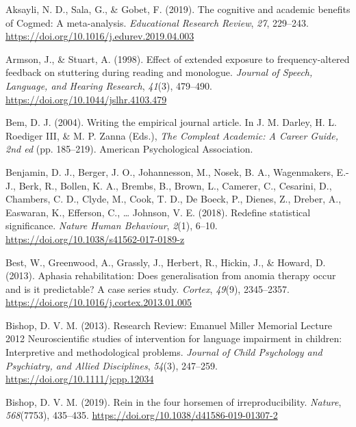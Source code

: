 \documentclass{krantz}
\newlength{\cslhangindent}
\newlength{\cslentryspacingunit} %
\newenvironment{CSLReferences}[2] %
{%
\setlength{\parindent}{0pt}
\ifodd #1
\let\oldpar\par
\def\par{\hangindent=\cslhangindent\oldpar}
\fi
\setlength{\parskip}{#2\cslentryspacingunit}
}%
{}
\begin{document}
\hypertarget{refs}{}
\begin{CSLReferences}{1}{0}
\leavevmode{}%
Aksayli, N. D., Sala, G., \& Gobet, F. (2019). The cognitive and academic benefits of {Cogmed}: {A} meta-analysis. \emph{Educational Research Review}, \emph{27}, 229--243. \url{https://doi.org/10.1016/j.edurev.2019.04.003}

\leavevmode{}%
Armson, J., \& Stuart, A. (1998). Effect of extended exposure to frequency-altered feedback on stuttering during reading and monologue. \emph{Journal of Speech, Language, and Hearing Research}, \emph{41}(3), 479--490. \url{https://doi.org/10.1044/jslhr.4103.479}

\leavevmode{}%
Bem, D. J. (2004). Writing the empirical journal article. In J. M. Darley, H. L. Roediger III, \& M. P. Zanna (Eds.), \emph{The {Compleat Academic}: {A Career Guide}, 2nd ed} (pp. 185--219). {American Psychological Association}.

\leavevmode{}%
Benjamin, D. J., Berger, J. O., Johannesson, M., Nosek, B. A., Wagenmakers, E.-J., Berk, R., Bollen, K. A., Brembs, B., Brown, L., Camerer, C., Cesarini, D., Chambers, C. D., Clyde, M., Cook, T. D., De Boeck, P., Dienes, Z., Dreber, A., Easwaran, K., Efferson, C., \ldots{} Johnson, V. E. (2018). Redefine statistical significance. \emph{Nature Human Behaviour}, \emph{2}(1), 6--10. \url{https://doi.org/10.1038/s41562-017-0189-z}

\leavevmode{}%
Best, W., Greenwood, A., Grassly, J., Herbert, R., Hickin, J., \& Howard, D. (2013). Aphasia rehabilitation: {Does} generalisation from anomia therapy occur and is it predictable? {A} case series study. \emph{Cortex}, \emph{49}(9), 2345--2357. \url{https://doi.org/10.1016/j.cortex.2013.01.005}

\leavevmode{}%
Bishop, D. V. M. (2013). Research {Review}: {Emanuel Miller Memorial Lecture} 2012 \textendash{} {Neuroscientific} studies of intervention for language impairment in children: Interpretive and methodological problems. \emph{Journal of Child Psychology and Psychiatry, and Allied Disciplines}, \emph{54}(3), 247--259. \url{https://doi.org/10.1111/jcpp.12034}

\leavevmode{}%
Bishop, D. V. M. (2019). Rein in the four horsemen of irreproducibility. \emph{Nature}, \emph{568}(7753), 435--435. \url{https://doi.org/10.1038/d41586-019-01307-2}


\end{CSLReferences}
\end{document}
